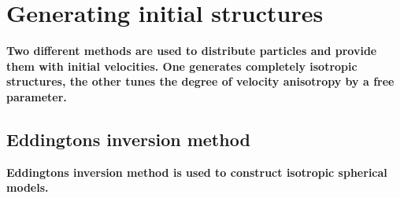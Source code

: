 \section{Generating initial structures}
\textbf{Two different methods are used to distribute particles and provide them with initial velocities. One generates completely isotropic structures, the other tunes the degree of velocity anisotropy by a free parameter.} \\ 

\subsection{Eddingtons inversion method}
\textbf{Eddingtons inversion method is used to construct isotropic spherical models.} \\ 

